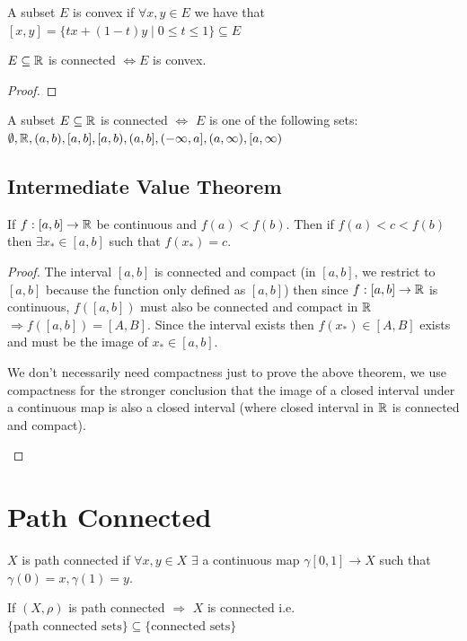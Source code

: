 \documentclass[a4paper]{article}
\begin{document}
\begin{definition}
  A subset $E$ is convex if  $\forall x,y \in E$ we have that  $[x,y] = \{tx + (1-t)y \mid 0 \leq t \leq 1\}  \subseteq E$ 
\end{definition}

\begin{theorem}
  $E \subseteq \mathbb{R}$ is connected $\iff E$ is convex. 
  
  \begin{proof}

  \end{proof}
\end{theorem}

\begin{corollary}
  A subset $E \subseteq \mathbb{R}$ is connected $\iff$ $E$ is one of the following sets:  \\
  $\emptyset, \mathbb{R}, (a,b), [a,b], [a,b), (a,b], (-\infty,a], (a, \infty), [a, \infty)$
\end{corollary}

\subsection{Intermediate Value Theorem}
\begin{corollary}
  If $f:[a,b] \to \mathbb{R}$ be continuous and $f(a) < f(b).$ Then if  $f(a) < c < f(b)$ then  $\exists x_{*} \in [a,b]$ such that $f(x_{*})  = c$. 

  \begin{proof}
    The interval $[a,b]$ is connected and compact  (in $[a,b]$, we restrict to $[a,b]$ because the function only defined as  $[a,b]$) then since $f:[a,b] \to \mathbb{R}$ is continuous, $f([a,b])$ must also be connected and compact in  $\mathbb{R}$ $\Rightarrow f([a,b]) = [A,B]$. Since the interval exists then $f(x_{*}) \in [A,B]$ exists and must be the image of $x_{*} \in [a,b]$. 

    \begin{note}
      We don't necessarily need compactness just to prove the above theorem, we use compactness for the stronger conclusion that the image of a closed interval under a continuous map is also a closed interval (where closed interval in $\mathbb{R}$ is connected and compact). 
    \end{note}
  \end{proof}
\end{corollary}

\section{Path Connected}
\begin{definition}
  $X$ is path connected if  $\forall x,y \in X$  $\exists $ a continuous map $\gamma [0,1] \to X$ such that  $\gamma(0) = x, \gamma(1) =y$.
\end{definition}

\begin{prop}
  If $(X,\rho)$ is path connected  $\Rightarrow$  $X$ is connected i.e.  $\{\text{path connected sets}\} \subseteq \{\text{connected sets}\}  $
\end{prop}
\end{document}
